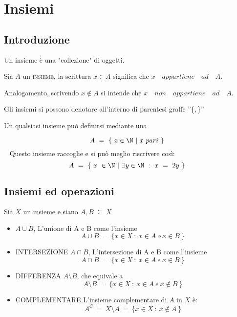 \documentclass[../analisi.tex]{subfiles}
\begin{document}
\section{Insiemi}
\subsection{Introduzione}

\begin{defn}
	Un insieme è una "collezione" di oggetti.
\end{defn}

Sia $A$ un \textsc{insieme}, la scrittura $ x \in A $ significa che $x \quad
appartiene \quad ad \quad A$.

Analogamento, scrivendo $ x \notin A $ si intende che $ x \quad non \quad appartiene \quad ad \quad A$.

Gli insiemi  si possono denotare all'interno di parentesi graffe $ " \{ , \} " $

Un qualsiasi insieme può definirsi mediante una 

\begin{esem}
	\begin{equation}
	A\ =\ \{\ x \in \N\ |\ x\ pari\ \}
	\end{equation} 
	Questo insieme raccoglie  e si può meglio riscrivere così:
	\begin{equation}
	A\ =\ \{\ x\ \in \N\ |\ \exists y \in \N\ :\ x\ =\ 2y\ \}
	\end{equation}
\end{esem}

\subsection{Insiemi ed operazioni}
Sia $X$ un insieme e siano $A,B\ \subseteq\ X$
\begin{itemize}
	\item {} $A \cup B$, L'unione di A e B come l'insieme 
		\begin{equation}
			A \cup B\ =\ \{ x \in X\ :\ x\in A\ o\ x\in B\ \}
		\end{equation}
	\item \textsc{INTERSEZIONE} $A \cap B$, L'intersezione di A e B come l'insieme
		\begin{equation}
			A \cap B\ =\ \{ x \in X\ :\ x\in A\ e\ x\in B\ \}
		\end{equation}
	\item \textsc{DIFFERENZA} $A \setminus B$, che equivale a
		\begin{equation}
			A \setminus B\ =\ \{x \in X\ :\ x \in A\ e\ x \notin B\ \}
		\end{equation}
	\item \textsc{COMPLEMENTARE} L'insieme complementare di $A$ in $X$ è:
		\begin{equation}
			A^C\ =\ X \setminus A\ =\ \{x \in X\ :\ x \notin A\ \}
		\end{equation}
\end{itemize}
\end{document}
